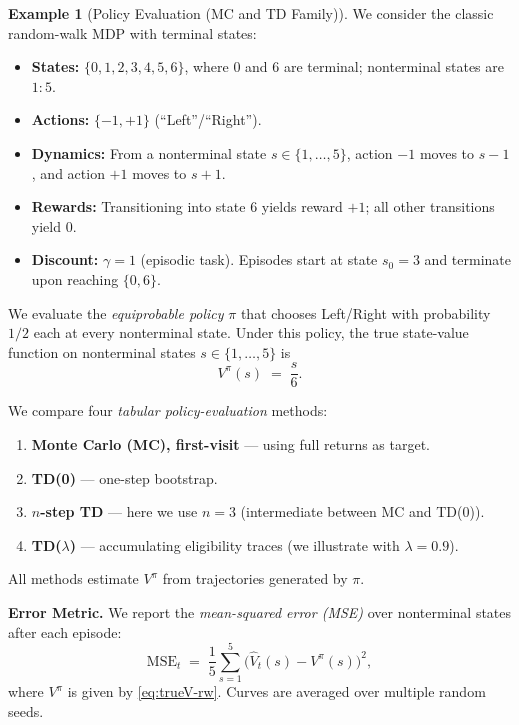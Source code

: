 \documentclass[
]{book}
\providecommand{\tightlist}{%
  \setlength{\itemsep}{0pt}\setlength{\parskip}{0pt}}
\theoremstyle{definition}
\theoremstyle{definition}
\newtheorem{example}{Example}[chapter]
\theoremstyle{definition}
\theoremstyle{definition}
\theoremstyle{remark}
\begin{document}
\begin{example}[Policy Evaluation (MC and TD Family)]
\protect\hypertarget{exm:PolicyEvaluationRandomWalk}{}\label{exm:PolicyEvaluationRandomWalk}We consider the classic random-walk MDP with terminal states:

\begin{itemize}
\tightlist
\item
  \textbf{States:} \(\{0,1,2,3,4,5,6\}\), where \(0\) and \(6\) are terminal; nonterminal states are \(1{:}5\).
\item
  \textbf{Actions:} \(\{-1,+1\}\) (``Left''/``Right'').
\item
  \textbf{Dynamics:} From a nonterminal state \(s\in\{1,\dots,5\}\), action \(-1\) moves to \(s-1\), and action \(+1\) moves to \(s+1\).
\item
  \textbf{Rewards:} Transitioning into state \(6\) yields reward \(+1\); all other transitions yield \(0\).
\item
  \textbf{Discount:} \(\gamma=1\) (episodic task). Episodes start at state \(s_0=3\) and terminate upon reaching \(\{0,6\}\).
\end{itemize}

We evaluate the \emph{equiprobable policy} \(\pi\) that chooses Left/Right with probability \(1/2\) each at every nonterminal state. Under this policy, the true state-value function on nonterminal states \(s\in\{1,\dots,5\}\) is
\begin{equation}
V^\pi(s) \;=\; \frac{s}{6}.
\label{eq:trueV-rw}
\end{equation}

We compare four \emph{tabular policy-evaluation} methods:

\begin{enumerate}
\def\labelenumi{\arabic{enumi}.}
\item
  \textbf{Monte Carlo (MC), first-visit} --- using full returns as target.
\item
  \textbf{TD(0)} --- one-step bootstrap.
\item
  \textbf{\(n\)-step TD} --- here we use \(n=3\) (intermediate between MC and TD(0)).
\item
  \textbf{TD(\(\lambda\))} --- accumulating eligibility traces (we illustrate with \(\lambda=0.9\)).
\end{enumerate}

All methods estimate \(V^\pi\) from trajectories generated by \(\pi\).

\textbf{Error Metric.}
We report the \emph{mean-squared error (MSE)} over nonterminal states after each episode:
\begin{equation}
\mathrm{MSE}_t \;=\; \frac{1}{5}\sum_{s=1}^{5}\big(\hat V_t(s)-V^\pi(s)\big)^2,
\label{eq:mse-metric}
\end{equation}
where \(V^\pi\) is given by \eqref{eq:trueV-rw}. Curves are averaged over multiple random seeds.


\end{example}
\end{document}
